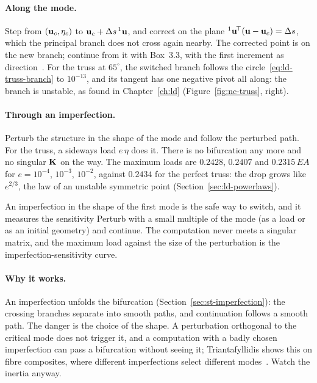 \paragraph{Along the mode.}
Step from $(\mathbf{u}_c,\eta_c)$ to $\mathbf{u}_c + \Delta s\,{}^1\mathbf{u}$, and correct on the plane
${}^1\mathbf{u}^{\!\top}(\mathbf{u} - \mathbf{u}_c) = \Delta s$, which the principal branch does not cross
again nearby. The corrected point is on the new branch; continue from it with Box~3.3,
with the first increment as direction~\cite[slide~4]{nc-triantafyllidis2018}. For the truss
at $65^\circ$, the switched branch follows the circle~\eqref{eq:ld-truss-branch} to
$10^{-13}$, and its tangent has one negative pivot all along: the branch is unstable, as
found in Chapter~\ref{ch:ld} (Figure~\ref{fig:nc-truss}, right).

\paragraph{Through an imperfection.}
Perturb the structure in the shape of the mode and follow the perturbed path. For the
truss, a sideways load $e\,\eta$ does it. There is no bifurcation any more and no singular
$\mathbf{K}$ on the way. The maximum loads are $0.2428$, $0.2407$ and $0.2315\,EA$ for
$e = 10^{-4}$, $10^{-3}$, $10^{-2}$, against $0.2434$ for the perfect truss: the drop grows
like $e^{2/3}$, the law of an unstable symmetric point (Section~\ref{sec:ld-powerlaws}).

\begin{gbox}{An imperfection in the shape of the first mode is the safe way to switch, and it measures the sensitivity}\label{sec:nc-imperfect-switch}
%
Perturb with a small multiple of the mode (as a load or as an initial geometry) and
continue. The computation never meets a singular matrix, and the maximum load against the
size of the perturbation is the imperfection-sensitivity curve.
\end{gbox}

\paragraph{Why it works.}
An imperfection unfolds the bifurcation (Section~\ref{sec:st-imperfection}): the
crossing branches separate into smooth paths, and continuation follows a smooth path.
The danger is the choice of the shape. A perturbation orthogonal to the critical mode
does not trigger it, and a computation with a badly chosen imperfection can pass a
bifurcation without seeing it; Triantafyllidis shows this on fibre composites, where
different imperfections select different modes~\cite[slide~20]{nc-triantafyllidis2018}.
Watch the inertia anyway.

